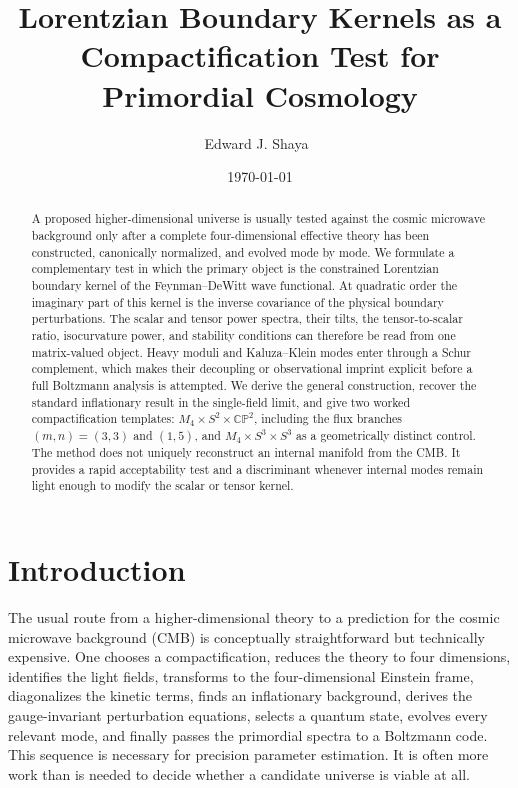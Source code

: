 \documentclass[aps,prd,twocolumn,superscriptaddress,nofootinbib,longbibliography,floatfix]{revtex4-2}
\newcommand{\CP}{\mathbb{CP}}
\begin{document}
\title{Lorentzian Boundary Kernels as a Compactification Test for Primordial Cosmology}

\author{Edward J. Shaya\ }



\date{\today}

\begin{abstract}
A proposed higher-dimensional universe is usually tested against the cosmic microwave background only after a complete four-dimensional effective theory has been constructed, canonically normalized, and evolved mode by mode. We formulate a complementary test in which the primary object is the constrained Lorentzian boundary kernel of the Feynman--DeWitt wave functional. At quadratic order the imaginary part of this kernel is the inverse covariance of the physical boundary perturbations. The scalar and tensor power spectra, their tilts, the tensor-to-scalar ratio, isocurvature power, and stability conditions can therefore be read from one matrix-valued object. Heavy moduli and Kaluza--Klein modes enter through a Schur complement, which makes their decoupling or observational imprint explicit before a full Boltzmann analysis is attempted. We derive the general construction, recover the standard inflationary result in the single-field limit, and give two worked compactification templates: $M_4\times S^2 \times \CP^2$, including the flux branches $(m,n)=(3,3)$ and $(1,5)$, and $M_4 \times S^3\times S^3$ as a geometrically distinct control. The method does not uniquely reconstruct an internal manifold from the CMB. It provides a rapid acceptability test and a discriminant whenever internal modes remain light enough to modify the scalar or tensor kernel.
\end{abstract}

\maketitle

\section{Introduction}
The usual route from a higher-dimensional theory to a prediction for the cosmic microwave background (CMB) is conceptually straightforward but technically expensive. One chooses a compactification, reduces the theory to four dimensions, identifies the light fields, transforms to the four-dimensional Einstein frame, diagonalizes the kinetic terms, finds an inflationary background, derives the gauge-invariant perturbation equations, selects a quantum state, evolves every relevant mode, and finally passes the primordial spectra to a Boltzmann code. This sequence is necessary for precision parameter estimation. It is often more work than is needed to decide whether a candidate universe is viable at all.
\end{document}
